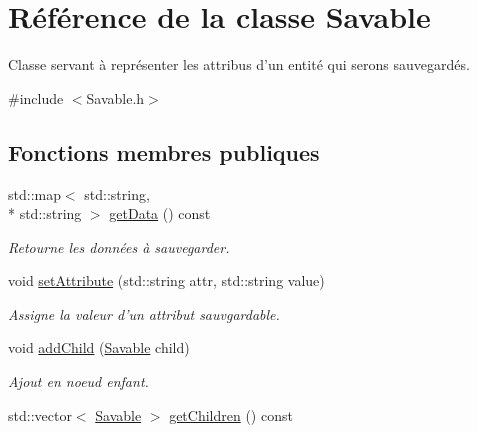 \hypertarget{class_savable}{\section{Référence de la classe Savable}
\label{class_savable}
}


Classe servant à représenter les attribus d'un entité qui serons sauvegardés.  




{\ttfamily \#include $<$Savable.\-h$>$}

\subsection*{Fonctions membres publiques}
\begin{DoxyCompactItemize}
\item 
\hypertarget{class_savable_a3390d86dd63d09fcc78b7f1a8dfe7590}{std\-::map$<$ std\-::string, \\*
std\-::string $>$ \hyperlink{class_savable_a3390d86dd63d09fcc78b7f1a8dfe7590}{get\-Data} () const }\label{class_savable_a3390d86dd63d09fcc78b7f1a8dfe7590}

\begin{DoxyCompactList}\small\item\em Retourne les données à sauvegarder. \end{DoxyCompactList}\item 
\hypertarget{class_savable_a37c8c891c636ab68a025396d216c8a2b}{void \hyperlink{class_savable_a37c8c891c636ab68a025396d216c8a2b}{set\-Attribute} (std\-::string attr, std\-::string value)}\label{class_savable_a37c8c891c636ab68a025396d216c8a2b}

\begin{DoxyCompactList}\small\item\em Assigne la valeur d'un attribut sauvgardable. \end{DoxyCompactList}\item 
\hypertarget{class_savable_a086a5d7b7acbf5f768f14b14689d07cc}{void \hyperlink{class_savable_a086a5d7b7acbf5f768f14b14689d07cc}{add\-Child} (\hyperlink{class_savable}{Savable} child)}\label{class_savable_a086a5d7b7acbf5f768f14b14689d07cc}

\begin{DoxyCompactList}\small\item\em Ajout en noeud enfant. \end{DoxyCompactList}\item 
\hypertarget{class_savable_a98e8f61b947ba8e200a2093dffb2d69e}{std\-::vector$<$ \hyperlink{class_savable}{Savable} $>$ \hyperlink{class_savable_a98e8f61b947ba8e200a2093dffb2d69e}{get\-Children} () const }\label{class_savable_a98e8f61b947ba8e200a2093dffb2d69e}


\end{DoxyCompactItemize}
